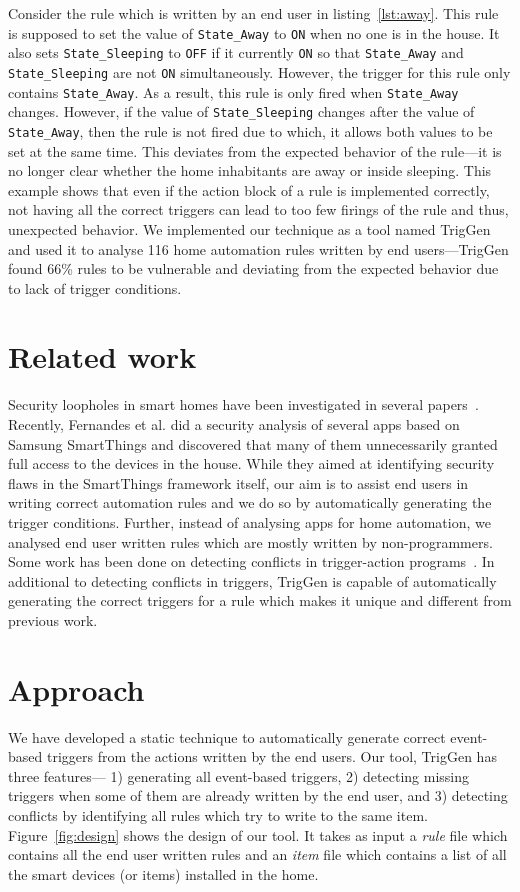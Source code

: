 \documentclass{sig-alternate-05-2015}
\begin{document}
Consider the rule which is written by an end user in listing~\ref{lst:away}. This rule is supposed to set the value of \texttt{State\_Away} to \texttt{ON} when no one is in the house. It also sets \texttt{State\_Sleeping} to \texttt{OFF} if it currently \texttt{ON} so that  \texttt{State\_Away} and \texttt{State\_Sleeping} are not \texttt{ON} simultaneously. However, the trigger for this rule only contains \texttt{State\_Away}. As a result, this rule is only fired when \texttt{State\_Away} changes. However, if the value of \texttt{State\_Sleeping} changes after the value of \texttt{State\_Away}, then the rule is not fired due to which, it allows both values to be set at the same time. This deviates from the expected behavior of the rule---it is no longer clear whether the home inhabitants are away or inside sleeping. This example shows that even if the action block of a rule is implemented correctly, not having all the correct triggers can lead to too few firings of the rule and thus, unexpected behavior. 
We implemented our technique as a tool named TrigGen and used it to analyse 116 home automation rules written by end users---TrigGen found 66\% rules to be vulnerable and deviating from the expected behavior due to lack of trigger conditions.

\section{Related work}
Security loopholes in smart homes have been investigated in several papers~\cite{yoshi, dhanjani, jung, todayToTomorrow}. Recently, Fernandes et al.\cite{smartthings16} did a  security analysis of several apps based on Samsung SmartThings and discovered that many of them unnecessarily granted full access to the devices in the house. While they aimed at identifying security flaws in the SmartThings framework itself, our aim is to assist end users in writing correct automation rules and we do so by automatically generating the trigger conditions.  Further, instead of analysing apps for home automation, we analysed end user written rules which are mostly written by non-programmers. Some work has been done on detecting conflicts in trigger-action programs~\cite{rvs, homer, utea}. In additional to detecting conflicts in triggers, TrigGen is capable of automatically generating the correct triggers for a rule which makes it unique and different from previous work.

\section{Approach}
We have developed a static technique to automatically generate correct event-based triggers from the actions written by the end users. Our tool, TrigGen has three features--- 1) generating all event-based triggers, 2) detecting missing triggers when some of them are already written by the end user, and 3) detecting conflicts by identifying all rules which try to write to the same item. 
Figure~\ref{fig:design} shows the design of our tool. It takes as input a \textit{rule} file which contains all the end user written rules and an \textit{item} file which contains a list of all the smart devices (or items) installed in the home. 
\end{document}
